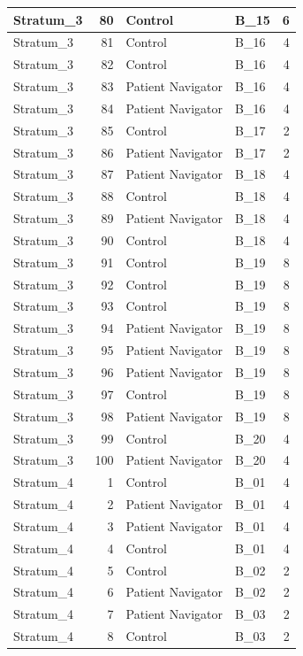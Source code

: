 \documentclass[
]{book}
\begin{document}
\begin{table}[H]
\begin{tabular}{l|r|l|l|r}
\hline
Stratum\_3 & 80 & Control & B\_15 & 6\\
\hline
Stratum\_3 & 81 & Control & B\_16 & 4\\
\hline
Stratum\_3 & 82 & Control & B\_16 & 4\\
\hline
Stratum\_3 & 83 & Patient Navigator & B\_16 & 4\\
\hline
Stratum\_3 & 84 & Patient Navigator & B\_16 & 4\\
\hline
Stratum\_3 & 85 & Control & B\_17 & 2\\
\hline
Stratum\_3 & 86 & Patient Navigator & B\_17 & 2\\
\hline
Stratum\_3 & 87 & Patient Navigator & B\_18 & 4\\
\hline
Stratum\_3 & 88 & Control & B\_18 & 4\\
\hline
Stratum\_3 & 89 & Patient Navigator & B\_18 & 4\\
\hline
Stratum\_3 & 90 & Control & B\_18 & 4\\
\hline
Stratum\_3 & 91 & Control & B\_19 & 8\\
\hline
Stratum\_3 & 92 & Control & B\_19 & 8\\
\hline
Stratum\_3 & 93 & Control & B\_19 & 8\\
\hline
Stratum\_3 & 94 & Patient Navigator & B\_19 & 8\\
\hline
Stratum\_3 & 95 & Patient Navigator & B\_19 & 8\\
\hline
Stratum\_3 & 96 & Patient Navigator & B\_19 & 8\\
\hline
Stratum\_3 & 97 & Control & B\_19 & 8\\
\hline
Stratum\_3 & 98 & Patient Navigator & B\_19 & 8\\
\hline
Stratum\_3 & 99 & Control & B\_20 & 4\\
\hline
Stratum\_3 & 100 & Patient Navigator & B\_20 & 4\\
\hline
Stratum\_4 & 1 & Control & B\_01 & 4\\
\hline
Stratum\_4 & 2 & Patient Navigator & B\_01 & 4\\
\hline
Stratum\_4 & 3 & Patient Navigator & B\_01 & 4\\
\hline
Stratum\_4 & 4 & Control & B\_01 & 4\\
\hline
Stratum\_4 & 5 & Control & B\_02 & 2\\
\hline
Stratum\_4 & 6 & Patient Navigator & B\_02 & 2\\
\hline
Stratum\_4 & 7 & Patient Navigator & B\_03 & 2\\
\hline
Stratum\_4 & 8 & Control & B\_03 & 2\\

\end{tabular}
\end{table}
\end{document}

